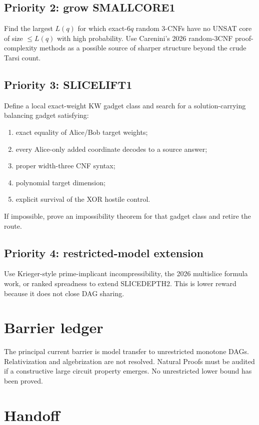\documentclass[11pt]{article}
\begin{document}
\subsection*{Priority 2: grow SMALLCORE1}
Find the largest \(L(q)\) for which exact-\(6q\) random 3-CNFs have no UNSAT core of size \(\le L(q)\) with high probability. Use Carenini's 2026 random-3CNF proof-complexity methods as a possible source of sharper structure beyond the crude Tarsi count.

\subsection*{Priority 3: SLICELIFT1}
Define a local exact-weight KW gadget class and search for a solution-carrying balancing gadget satisfying:
\begin{enumerate}
\item exact equality of Alice/Bob target weights;
\item every Alice-only added coordinate decodes to a source answer;
\item proper width-three CNF syntax;
\item polynomial target dimension;
\item explicit survival of the XOR hostile control.
\end{enumerate}
If impossible, prove an impossibility theorem for that gadget class and retire the route.

\subsection*{Priority 4: restricted-model extension}
Use Krieger-style prime-implicant incompressibility, the 2026 multislice formula work, or ranked spreadness to extend SLICEDEPTH2. This is lower reward because it does not close DAG sharing.

\section{Barrier ledger}

The principal current barrier is model transfer to unrestricted monotone DAGs. Relativization and algebrization are not resolved. Natural Proofs must be audited if a constructive large circuit property emerges. No unrestricted lower bound has been proved.

\section{Handoff}
\end{document}
